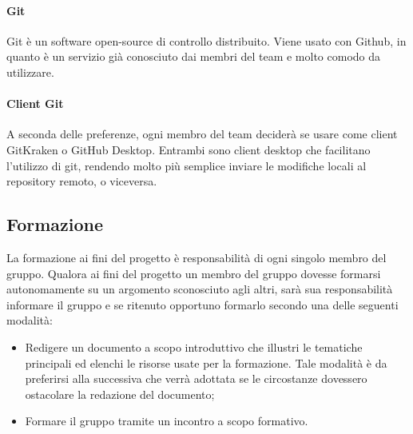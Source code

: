 \paragraph{Git}\Spazio
Git è un software open-source di controllo  distribuito.
Viene usato con Github, in quanto è un servizio già conosciuto dai membri del team e molto comodo da utilizzare.

\paragraph{Client Git}\Spazio
A seconda delle preferenze, ogni membro del team deciderà se usare come client GitKraken o GitHub Desktop. Entrambi sono client desktop che facilitano l'utilizzo di git, rendendo molto più semplice inviare le modifiche locali al repository remoto, o viceversa.
\subsection{Formazione}
La formazione ai fini del progetto è responsabilità di ogni singolo membro del gruppo. Qualora ai fini del progetto un membro del gruppo dovesse formarsi autonomamente su un argomento sconosciuto agli altri, sarà sua responsabilità informare il gruppo e se ritenuto opportuno formarlo secondo una delle seguenti modalità:
\begin{itemize}
\item Redigere un documento a scopo introduttivo che illustri le tematiche principali ed
elenchi le risorse usate per la formazione. Tale modalità è da preferirsi alla successiva che verrà adottata se le circostanze dovessero ostacolare la redazione del documento;
\item Formare il gruppo tramite un incontro a scopo formativo.
\end{itemize}
\pagebreak
